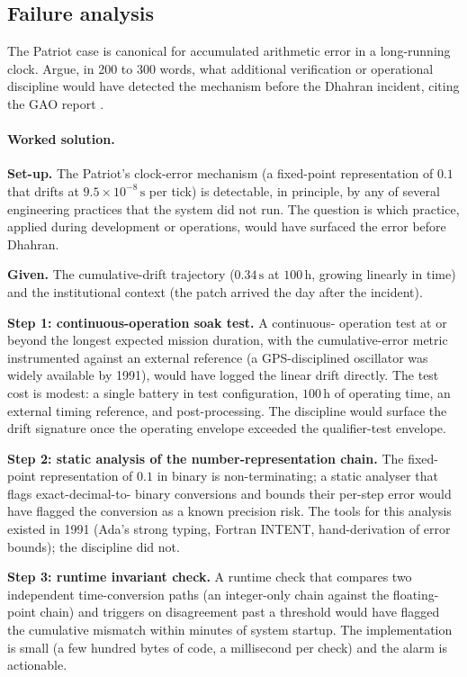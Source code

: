 \subsection*{Failure analysis}

\begin{exercise}
The Patriot case is canonical for accumulated arithmetic error in a
long-running clock. Argue, in 200 to 300 words, what additional
verification or operational discipline would have detected the
mechanism before the Dhahran incident, citing the GAO report
\cite{acc:gao-patriot-1992}.

\paragraph{Worked solution.}
\textbf{Set-up.} The Patriot's clock-error mechanism (a fixed-point
representation of $0.1$ that drifts at $9.5 \times 10^{-8}\,\si
{\second}$ per tick) is detectable, in principle, by any of
several engineering practices that the system did not run. The
question is which practice, applied during development or
operations, would have surfaced the error before Dhahran.

\textbf{Given.} The cumulative-drift trajectory ($0.34 \,\si
{\second}$ at $100 \,\si{\hour}$, growing linearly in time) and
the institutional context (the patch arrived the day after the
incident).

\textbf{Step 1: continuous-operation soak test.} A continuous-
operation test at or beyond the longest expected mission duration,
with the cumulative-error metric instrumented against an external
reference (a GPS-disciplined oscillator was widely available by
1991), would have logged the linear drift directly. The test cost
is modest: a single battery in test configuration, $100 \,\si
{\hour}$ of operating time, an external timing reference, and
post-processing. The discipline would surface the drift signature
once the operating envelope exceeded the qualifier-test envelope.

\textbf{Step 2: static analysis of the number-representation
chain.} The fixed-point representation of $0.1$ in binary is
non-terminating; a static analyser that flags exact-decimal-to-
binary conversions and bounds their per-step error would have
flagged the conversion as a known precision risk. The tools for
this analysis existed in 1991 (Ada's strong typing, Fortran
INTENT, hand-derivation of error bounds); the discipline did not.

\textbf{Step 3: runtime invariant check.} A runtime check that
compares two independent time-conversion paths (an integer-only
chain against the floating-point chain) and triggers on
disagreement past a threshold would have flagged the cumulative
mismatch within minutes of system startup. The implementation is
small (a few hundred bytes of code, a millisecond per check) and
the alarm is actionable.


\end{exercise}
